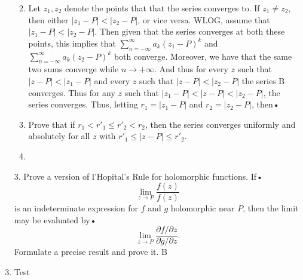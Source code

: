 \documentclass[12pt]{article}
\makeatletter
\theoremstyle{definition}
\theoremstyle{remark}
\newcommand{\abs}[1]{\lvert #1 \rvert}
\renewenvironment{proof}[1][\proofname]{\par
  \pushQED{\qed}%
  \normalfont \topsep6\p@\@plus6\p@\relax
  \list{}{\leftmargin=0mm
          \rightmargin=4mm
          \settowidth{\itemindent}{\itshape#1}%
          \labelwidth=\itemindent
          \parsep=0pt \listparindent=\parindent 
  }
  \item[\hskip\labelsep
        \itshape
    #1\@addpunct{.}]\ignorespaces
}{%
  \popQED\endlist\@endpefalse
}
\let\oldproofname=\proofname
\renewcommand{\proofname}{\bf{\textit{\oldproofname}}}
\makeatother
\begin{document}
\begin{enumerate}[leftmargin=*]
\begin{enumerate}
\begin{proof}
                            Let $z_1, z_2$ denote the points that that the
                            series converges to. If $z_1\neq z_2$, then
                            either $\abs{z_1-P}<\abs{z_2-P}$, or vice
                            versa. WLOG, assume that
                            $\abs{z_1-P}<\abs{z_2-P}$. Then given that the
                            series converges at both these points, this
                            implies that
                            $\sum_{n=-\infty}^{\infty}a_k(z_1-P)^k$ and
                            $\sum_{n=-\infty}^{\infty}a_k(z_2-P)^k$ both
                            converge. Moreover, we have that the same two
                            sums converge while $n\rightarrow+\infty$. And
                            thus for every $z$ such that
                            $\abs{z-P}<\abs{z_1-P}$ and every $z$ such
                            that $\abs{z-P}<\abs{z_2-P}$ the series
                            B
                            converges. Thus for any $z$ such that
                            $\abs{z_1-P}<\abs{z-P}<\abs{z_2-P}$, the series
                            converges. Thus, letting $r_1=\abs{z_1-P}$ and
                            $r_2=\abs{z_2-P}$, then•
                        \end{proof}
                    \item Prove that if $r_1<r'_1\leq r'_2<r_2$, then the
                        series converges uniformly and absolutely for all $z$
                        with $r'_1\leq\abs{z-P}\leq r'_2$.
                        \begin{proof}

                        \end{proof}
            \end{enumerate}
        \item[3.] Prove a version of l'Hopital's Rule for holomorphic functions. If•
            \begin{equation*}
                \lim_{z\rightarrow P}\frac{f(z)}{f(z)}
            \end{equation*}
            is an indeterminate expression for $f$ and $g$ holomorphic near $P$, then the limit may be evaluated by•
            \begin{equation*}
                \lim_{z\rightarrow P}\frac{\partial f/\partial z}{\partial
                g/\partial z}.
            \end{equation*}
            Formulate a precise result and prove it.
            B
        \item Test
    \end{enumerate}
\end{document}
